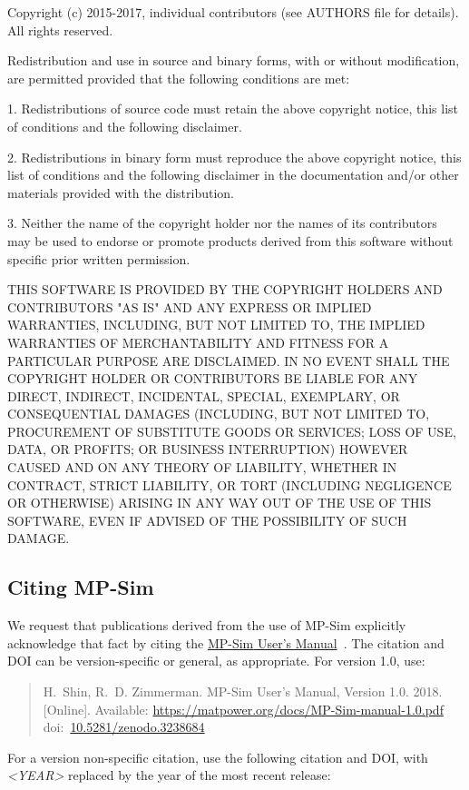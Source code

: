 \documentclass[12pt]{article}
\newcommand{\mpsim}[0]{{MP-Sim}}
\newcommand{\mpsimver}[0]{1.0}
\newcommand{\mpsimmanurl}[0]{https://matpower.org/docs/MP-Sim-manual-\mpsimver.pdf}
\newcommand{\mpsimman}[0]{\href{\mpsimmanurl}{\mpsim{} User's Manual}}
\newcommand{\doi}[1]{doi:~\href{https://doi.org/#1}{#1}}
\numberwithin{equation}{section}
\numberwithin{table}{section}
\numberwithin{figure}{section}
\begin{document}
\begin{Notice}
Copyright (c) 2015-2017, individual contributors (see AUTHORS file
for details).  All rights reserved.

Redistribution and use in source and binary forms, with or without
modification, are permitted provided that the following conditions
are met:

1. Redistributions of source code must retain the above copyright
notice, this list of conditions and the following disclaimer.

2. Redistributions in binary form must reproduce the above copyright
notice, this list of conditions and the following disclaimer in the
documentation and/or other materials provided with the distribution.

3. Neither the name of the copyright holder nor the names of its
contributors may be used to endorse or promote products derived from
this software without specific prior written permission.

THIS SOFTWARE IS PROVIDED BY THE COPYRIGHT HOLDERS AND CONTRIBUTORS
"AS IS" AND ANY EXPRESS OR IMPLIED WARRANTIES, INCLUDING, BUT NOT
LIMITED TO, THE IMPLIED WARRANTIES OF MERCHANTABILITY AND FITNESS
FOR A PARTICULAR PURPOSE ARE DISCLAIMED. IN NO EVENT SHALL THE
COPYRIGHT HOLDER OR CONTRIBUTORS BE LIABLE FOR ANY DIRECT, INDIRECT,
INCIDENTAL, SPECIAL, EXEMPLARY, OR CONSEQUENTIAL DAMAGES (INCLUDING,
BUT NOT LIMITED TO, PROCUREMENT OF SUBSTITUTE GOODS OR SERVICES;
LOSS OF USE, DATA, OR PROFITS; OR BUSINESS INTERRUPTION) HOWEVER
CAUSED AND ON ANY THEORY OF LIABILITY, WHETHER IN CONTRACT, STRICT
LIABILITY, OR TORT (INCLUDING NEGLIGENCE OR OTHERWISE) ARISING IN
ANY WAY OUT OF THE USE OF THIS SOFTWARE, EVEN IF ADVISED OF THE
POSSIBILITY OF SUCH DAMAGE.
\end{Notice}

\clearpage
\subsection{Citing \mpsim{}}

We request that publications derived from the use of \mpsim{} explicitly
acknowledge that fact by citing the \mpsimman{}~\cite{mpsim}.
The citation and DOI can be version-specific or general, as appropriate.
For version 1.0, use:

\begin{quote}
\footnotesize
H.~Shin, R.~D. Zimmerman. \mpsim{} User's Manual, Version 1.0. 2018.
[Online]. Available: \url{https://matpower.org/docs/MP-Sim-manual-1.0.pdf}\\
\doi{10.5281/zenodo.3238684}
\end{quote}
For a version non-specific citation, use the following citation and DOI,
with \emph{\textless{}YEAR\textgreater{}} replaced by the year of the most recent release:
\end{document}
